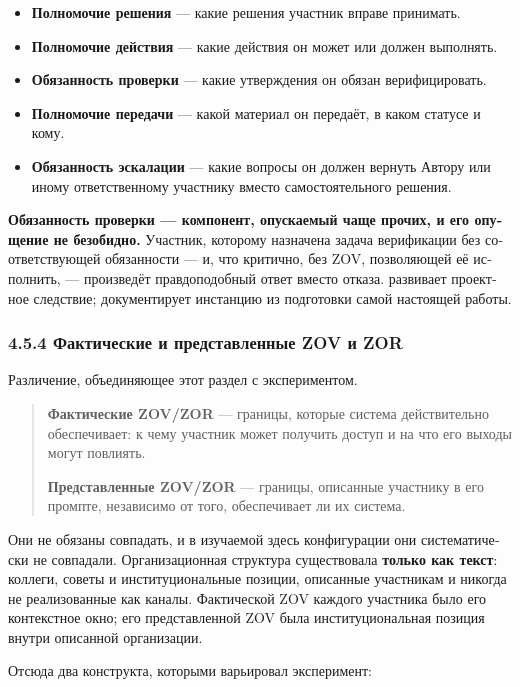 \begin{russian}
\begin{itemize}
  \item \textbf{Полномочие решения} — какие решения участник вправе принимать.
  \item \textbf{Полномочие действия} — какие действия он может или должен выполнять.
  \item \textbf{Обязанность проверки} — какие утверждения он обязан верифицировать.
  \item \textbf{Полномочие передачи} — какой материал он передаёт, в каком статусе и кому.
  \item \textbf{Обязанность эскалации} — какие вопросы он должен вернуть Автору или иному ответственному участнику вместо самостоятельного решения.
\end{itemize}
\textbf{Обязанность проверки — компонент, опускаемый чаще прочих, и его опущение не безобидно.} Участник, которому назначена задача верификации без соответствующей обязанности — и, что критично, без ZOV, позволяющей её исполнить, — произведёт правдоподобный ответ вместо отказа.  развивает проектное следствие;  документирует инстанцию из подготовки самой настоящей работы.


\subsubsection*{4.5.4 Фактические и представленные ZOV и ZOR}
\label{sec:ru:4.5.4}

Различение, объединяющее этот раздел с экспериментом.

\begin{quote}
\textbf{Фактические ZOV/ZOR} — границы, которые система действительно обеспечивает: к чему участник может получить доступ и на что его выходы могут повлиять.

\textbf{Представленные ZOV/ZOR} — границы, описанные участнику в его промпте, независимо от того, обеспечивает ли их система.
\end{quote}
Они не обязаны совпадать, и в изучаемой здесь конфигурации они систематически не совпадали. Организационная структура существовала \textbf{только как текст}: коллеги, советы и институциональные позиции, описанные участникам и никогда не реализованные как каналы. Фактической ZOV каждого участника было его контекстное окно; его представленной ZOV была институциональная позиция внутри описанной организации.

Отсюда два конструкта, которыми варьировал эксперимент:


\end{russian}

